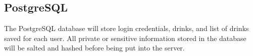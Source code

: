 {    \subsection{PostgreSQL}

        The PostgreSQL database will store login credentials, drinks, and list
        of drinks saved for each user. All private or sensitive information 
        stored in the database will be salted and hashed before being put into 
        the server.
}
